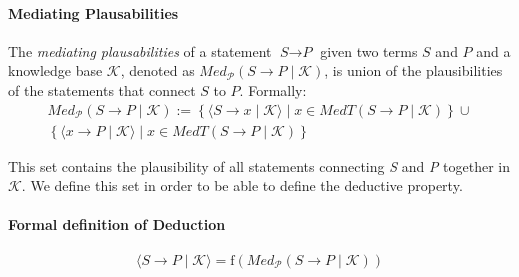 \documentclass{article}
\newcommand{\kb}[0]{\mathcal{K}}
\newcommand{\term}[1]{\textit{#1}}
\newcommand{\tstatement}[2]{\term{#1} \to \term{#2}}
\newcommand{\plausability}[3]{\langle\tstatement{#1}{#2} \mid \mathcal{#3}\rangle}
\begin{document}
\paragraph{Mediating Plausabilities}
The \textit{mediating plausabilities} of a statement $\tstatement{S}{P}$ given two terms $S$ and $P$ and a knowledge base $\kb$, denoted as ${Med}_{\mathcal{P}}(\tstatement{S}{P} \mid \kb)$, is union of the plausibilities of the statements that connect $S$ to $P$. Formally:
\[
\begin{split}
{Med}_{\mathcal{P}}(S \to P \mid \kb) := \left\{ \plausability{S}{x}{\kb} \mid x \in MedT(\tstatement{S}{P} \mid \kb) \right\} \cup \\
\left\{ \plausability{x}{P}{\kb} \mid x \in MedT(\tstatement{S}{P} \mid \kb) 
\right\}
\end{split}
\]

This set contains the plausibility of all statements connecting \term{S} and \term{P} together in $\kb$. We define this set in order to be able to define the deductive property.

\paragraph{Formal definition of Deduction}
\[
    \plausability{S}{P}{K} = \text{f}({Med}_{\mathcal{P}}(\tstatement{S}{P} \mid \kb))
\]

\end{document}
